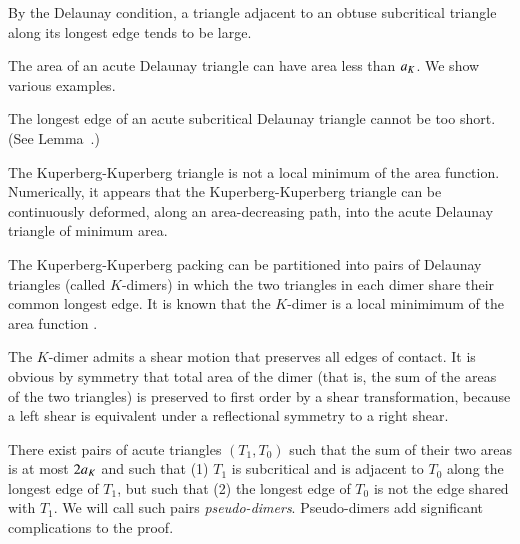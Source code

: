 \begin{example} By the Delaunay condition, a triangle adjacent to an obtuse subcritical
triangle along its longest edge tends to be large.
\end{example}

\begin{example} The area of an acute Delaunay triangle can have area less than
$a_K$.  We show various examples.
\end{example}

\begin{example} The longest edge of an acute subcritical Delaunay triangle cannot be too short.
(See Lemma~.)
\end{example}

\begin{example}  The Kuperberg-Kuperberg triangle is not a local minimum of the area function.
Numerically, it appears that the Kuperberg-Kuperberg triangle can be continuously deformed, along an area-decreasing
path, into the acute Delaunay triangle of minimum area.
\end{example}

\begin{example}  The Kuperberg-Kuperberg packing can be partitioned into pairs
of Delaunay triangles (called $K$-dimers) in which the two triangles
in each dimer share their common longest edge.  It is known that the $K$-dimer is a local
minimimum of the area function \cite{Kus}.
\end{example}

\begin{example} The $K$-dimer admits a shear motion that preserves all edges of contact.
It is obvious by symmetry that total area of the dimer (that is, the sum of the areas of the two triangles)
is preserved to first order by a shear transformation, 
because a left shear is equivalent under a reflectional symmetry to a right shear.
\end{example}

\begin{example} There exist pairs of acute triangles $(T_1,T_0)$ such that the sum of their two areas
 is at most $2a_K$ and such that (1) $T_1$ is subcritical and is adjacent to $T_0$ 
along the longest edge of $T_1$, but such that (2) the longest edge of $T_0$ is 
not the edge shared with $T_1$.  We will call such pairs {\it pseudo-dimers}.
 Pseudo-dimers add significant complications to the proof.
\end{example}

